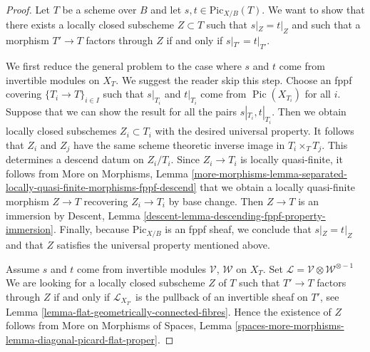 \documentclass{stacks-project}
\theoremstyle{plain}
\theoremstyle{definition}
\theoremstyle{remark}
\numberwithin{equation}{subsection}
\def\Pic{\mathop{\mathrm{Pic}}\nolimits}
\def\Picardfunctor{\mathrm{Pic}}
\begin{document}
\begin{proof}
Let $T$ be a scheme over $B$ and let $s, t \in \Picardfunctor_{X/B}(T)$.
We want to show that there exists a locally closed subscheme $Z \subset T$
such that $s|_Z = t|_Z$ and such that a morphism $T' \to T$ factors
through $Z$ if and only if $s|_{T'} = t|_{T'}$.

\medskip\noindent
We first reduce the general problem to the case where $s$ and $t$ come
from invertible modules on $X_T$. We suggest the reader skip this step.
Choose an fppf covering $\{T_i \to T\}_{i \in I}$ such that
$s|_{T_i}$ and $t|_{T_i}$ come from $\Pic(X_{T_i})$ for all $i$.
Suppose that we can show the result for all the pairs
$s|_{T_i}, t|_{T_i}$. Then we obtain locally closed subschemes
$Z_i \subset T_i$ with the desired universal property.
It follows that $Z_i$ and $Z_j$ have the same scheme theoretic
inverse image in $T_i \times_T T_j$.
This determines a descend datum on $Z_i/T_i$.
Since $Z_i \to T_i$ is locally quasi-finite, it follows from
More on Morphisms, Lemma
\ref{more-morphisms-lemma-separated-locally-quasi-finite-morphisms-fppf-descend}
that we obtain a locally quasi-finite morphism $Z \to T$
recovering $Z_i \to T_i$ by base change. Then $Z \to T$ is an immersion
by Descent, Lemma \ref{descent-lemma-descending-fppf-property-immersion}.
Finally, because $\Picardfunctor_{X/B}$ is an fppf sheaf, we conclude
that $s|_Z = t|_Z$ and that $Z$ satisfies the universal property
mentioned above.

\medskip\noindent
Assume $s$ and $t$ come from invertible modules $\mathcal{V}$, $\mathcal{W}$
on $X_T$.
Set $\mathcal{L} = \mathcal{V} \otimes \mathcal{W}^{\otimes -1}$
We are looking for a locally closed subscheme $Z$ of $T$
such that $T' \to T$ factors through $Z$ if and only if $\mathcal{L}_{X_{T'}}$
is the pullback of an invertible sheaf on $T'$, see
Lemma \ref{lemma-flat-geometrically-connected-fibres}.
Hence the existence of $Z$ follows from
More on Morphisms of Spaces, Lemma
\ref{spaces-more-morphisms-lemma-diagonal-picard-flat-proper}.
\end{proof}
\end{document}
